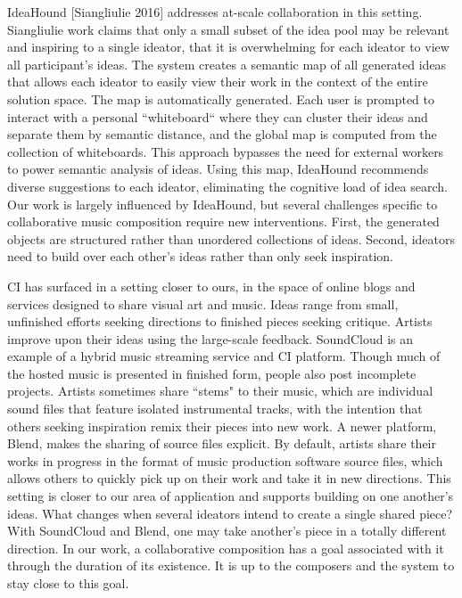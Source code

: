 \documentclass[final,authoryear,11pt,times]{elsarticle}
\begin{document}
IdeaHound [Siangliulie 2016] addresses at-scale collaboration in this setting. Siangliulie work claims that only a small subset of the idea pool may be relevant and inspiring to a single ideator, that it is overwhelming for each ideator to view all participant's ideas. The system creates a semantic map of all generated ideas that allows each ideator to easily view their work in the context of the entire solution space. The map is automatically generated. Each user is prompted to interact with a personal ``whiteboard`` where they can cluster their ideas and separate them by semantic distance, and the global map is computed from the collection of whiteboards. This approach bypasses the need for external workers to power semantic analysis of ideas.  Using this map, IdeaHound recommends diverse suggestions to each ideator, eliminating the cognitive load of idea search. Our work is largely influenced by IdeaHound, but several challenges specific to collaborative music composition require new interventions. First, the generated objects are structured rather than unordered collections of ideas. Second, ideators need to build over each other's ideas rather than only seek inspiration.

CI has surfaced in a setting closer to ours, in the space of online blogs and services designed to share visual art and music. Ideas range from small, unfinished efforts seeking directions to finished pieces seeking critique. Artists improve upon their ideas using the large-scale feedback. SoundCloud is an example of a hybrid music streaming service and CI platform. Though much of the hosted music is presented in finished form, people also post incomplete projects. Artists sometimes share ``stems" to their music, which are individual sound files that feature isolated instrumental tracks, with the intention that others seeking inspiration remix their pieces into new work. A newer platform, Blend, makes the sharing of source files explicit. By default, artists share their works in progress in the format of music production software source files, which allows others to quickly pick up on their work and take it in new directions. This setting is closer to our area of application and supports building on one another's ideas.  What changes when several ideators intend to create a single shared piece? With SoundCloud and Blend, one may take another's piece in a totally different direction. In our work, a collaborative composition has a goal associated with it through the duration of its existence. It is up to the composers and the system to stay close to this goal.
\end{document}
